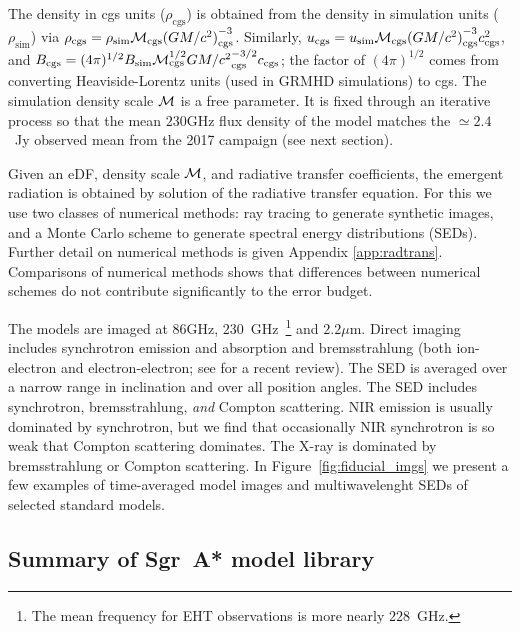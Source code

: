 The density in cgs units ($\rho_\mathrm{cgs}$) is obtained from the density  in simulation units ($\rho_\mathrm{sim}$) via $\rho_\mathrm{cgs} = \rho_\mathrm{sim} \mathcal{M}_\mathrm{cgs} {(GM/c^2)}_\mathrm{cgs}^{-3}$.  Similarly, $u_\mathrm{cgs} = u_\mathrm{sim} \mathcal{M}_\mathrm{cgs} {(GM/c^2)}_\mathrm{cgs}^{-3} c_\mathrm{cgs}^2$, and $B_\mathrm{cgs} = (4\pi)^{1/2} B_\mathrm{sim} \mathcal{M}_\mathrm{cgs}^{1/2} {GM/c^2}_\mathrm{cgs}^{-3/2} c_\mathrm{cgs}$; the factor of $(4\pi)^{1/2}$ comes from converting Heaviside-Lorentz units (used in GRMHD simulations) to cgs.
The simulation density scale $\mathcal{M}$ is a free parameter.  It is fixed through an iterative process so that the mean $230$GHz flux density of the model matches the $\simeq 2.4$~Jy observed mean from the 2017 campaign (see next section).


Given an eDF, density scale $\mathcal{M}$, and radiative transfer coefficients, the emergent radiation is obtained by solution of the radiative transfer equation.  For this we use two classes of numerical methods: ray tracing to generate synthetic images, and a Monte Carlo scheme to generate spectral energy distributions (SEDs).  Further detail on numerical methods is given Appendix \ref{app:radtrans}.  Comparisons of numerical methods \citep[][Prather et al. 2021]{2020ApJ...897..148G} shows that differences between numerical schemes do not contribute significantly to the error budget.

The models are imaged at $86$GHz, $230$~GHz~\footnote{The mean frequency for  EHT observations is more nearly $228$~GHz.} and $2.2\mu$m.  Direct imaging includes synchrotron emission and absorption and bremsstrahlung (both ion-electron and electron-electron; see \citet{2020ApJ...898...50Y} for a recent review).  The SED is averaged over a narrow range in inclination and over all position angles. The SED includes synchrotron, bremsstrahlung, {\em and} Compton scattering.  NIR emission is usually dominated by synchrotron, but we find that occasionally NIR synchrotron is so weak that Compton scattering dominates.  The X-ray is dominated by bremsstrahlung or Compton scattering.
In Figure~\ref{fig:fiducial_imgs} we present a few examples of time-averaged model images and multiwavelenght SEDs of selected standard \sgra models.

\subsection{Summary of Sgr~A* model library}

